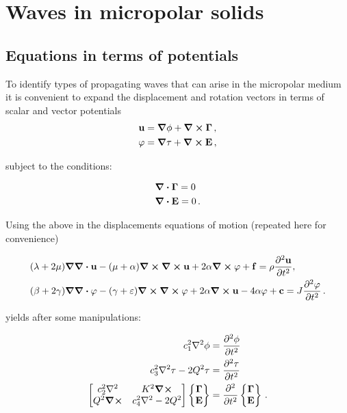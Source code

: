 \documentclass[12pt]{article}
\begin{document}
\section{Waves in micropolar solids}
\subsection{Equations in terms of potentials}

To identify types of propagating waves that can arise in the micropolar medium it is convenient to expand the displacement and rotation vectors in terms of scalar and vector potentials
\begin{align*}
\vb{u} &= \grad \phi + \curl\vb{\Gamma}\, ,\\
\vb{\varphi} &= \grad \tau + \curl\vb{E}\, ,
\end{align*}

subject to the conditions:

\begin{align*}
&\div\vb{\Gamma} = 0\\
&\div\vb{E} = 0\, .
\end{align*}

Using the above in the displacements equations of motion (repeated here for convenience)

\begin{subequations}\label{eq:disp_vector}
  \begin{align}
    & (\lambda + 2\mu) \grad\div\vb{u} - (\mu + \alpha)\curl\curl\vb{u} + 2\alpha \curl\vb{\varphi} + \vb{f} = \rho \pdv[2]{\vb{u}}{t}, \\
    & (\beta + 2\gamma) \grad\div\vb{\varphi} - (\gamma + \varepsilon) \curl\curl\vb{\varphi} +  2\alpha \curl\vb{u} - 4\alpha\vb{\varphi} + \vb{c} = J \pdv[2]{\vb{\varphi}}{t}\, .
  \end{align}
\end{subequations}


yields after some manipulations:

\begin{subequations}
  \begin{align}\label{eq:potential_waves}
    c_1^2 \laplacian\phi &= \pdv[2]{\phi}{t}\\
    c_3^2 \laplacian\tau - 2Q^2\tau &= \pdv[2]{\tau}{t}\\
    \begin{bmatrix}
      c_2^2\laplacian &K^2\curl\\
      Q^2\curl &c_4^2\laplacian - 2Q^2
    \end{bmatrix}
    \begin{Bmatrix} \vb{\Gamma}\\ \vb{E}\end{Bmatrix} &=
    \pdv[2]{t} \begin{Bmatrix} \vb{\Gamma}\\ \vb{E}\end{Bmatrix}\,.
  \end{align}
\end{subequations}
\end{document}
